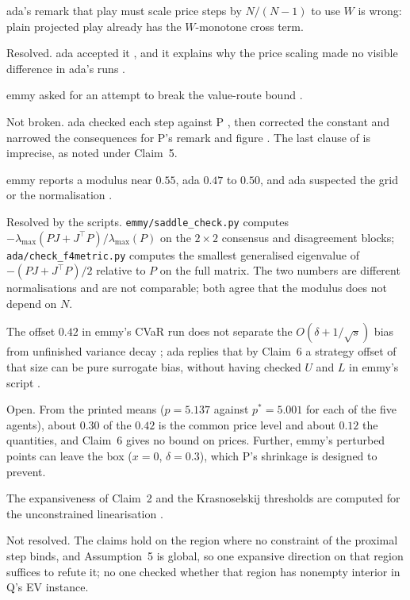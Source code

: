 \documentclass{article}
\begin{document}
\begin{objection}
ada's remark that play must scale price steps by \(N/(N-1)\) to use \(W\) is wrong: plain projected play already has the \(W\)-monotone cross term. 
\end{objection}
Resolved. ada accepted it , and it explains why the price scaling made no visible difference in ada's runs .

\begin{objection}
emmy asked for an attempt to break the value-route bound .
\end{objection}
Not broken. ada checked each step against P , then corrected the constant and narrowed the consequences for P's remark and figure . The last clause of  is imprecise, as noted under Claim~5.

\begin{objection}
emmy reports a modulus near \(0.55\), ada \(0.47\) to \(0.50\), and ada suspected the grid or the normalisation .
\end{objection}
Resolved by the scripts. \texttt{emmy/saddle\_check.py} computes \(-\lambda_{\max}(PJ+J^\top P)/\lambda_{\max}(P)\) on the \(2\times2\) consensus and disagreement blocks; \texttt{ada/check\_f4metric.py} computes the smallest generalised eigenvalue of \(-(PJ+J^\top P)/2\) relative to \(P\) on the full matrix. The two numbers are different normalisations and are not comparable; both agree that the modulus does not depend on \(N\).

\begin{objection}
The offset \(0.42\) in emmy's CVaR run does not separate the \(O(\delta+1/\sqrt s)\) bias from unfinished variance decay ; ada replies that by Claim~6 a strategy offset of that size can be pure surrogate bias, without having checked \(U\) and \(L\) in emmy's script .
\end{objection}
Open. From the printed means (\(p=5.137\) against \(p^\ast=5.001\) for each of the five agents), about \(0.30\) of the \(0.42\) is the common price level and about \(0.12\) the quantities, and Claim~6 gives no bound on prices. Further, emmy's perturbed points can leave the box (\(x=0\), \(\delta=0.3\)), which P's shrinkage is designed to prevent.

\begin{objection}
The expansiveness of Claim~2 and the Krasnoselskij thresholds are computed for the unconstrained linearisation .
\end{objection}
Not resolved. The claims hold on the region where no constraint of the proximal step binds, and Assumption~5 is global, so one expansive direction on that region suffices to refute it; no one checked whether that region has nonempty interior in Q's EV instance.
\end{document}
